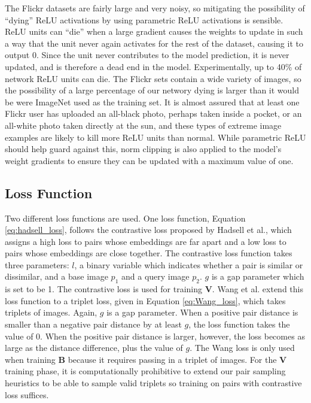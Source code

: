 The Flickr datasets are fairly large and very noisy, so mitigating the possibility of ``dying'' ReLU activations by using parametric ReLU activations is sensible. ReLU units can ``die'' when a large gradient causes the weights to update in such a way that the unit never again activates for the rest of the dataset, causing it to output 0. Since the unit never contributes to the model prediction, it is never updated, and is therefore a dead end in the model. Experimentally, up to 40\% of network ReLU units can die. The Flickr sets contain a wide variety of images, so the possibility of a large percentage of our networy dying is larger than it would be were ImageNet used as the training set. It is almost assured that at least one Flickr user has uploaded an all-black photo, perhaps taken inside a pocket, or an all-white photo taken directly at the sun, and these types of extreme image examples are likely to kill more ReLU units than normal. While parametric ReLU should help guard against this, norm clipping is also applied to the model's weight gradients to ensure they can be updated with a maximum value of one.

\subsection{Loss Function}
Two different loss functions are used. One loss function, Equation \ref{eq:hadsell_loss}, follows the contrastive loss proposed by Hadsell et al.\cite{hadsell2006dimensionality}, which assigns a high loss to pairs whose embeddings are far apart and a low loss to pairs whose embeddings are close together. The contrastive loss function takes three parameters: $l$, a binary variable which indicates whether a pair is similar or dissimilar, and a base image $p_1$ and a query image $p_2$. $g$ is a gap parameter which is set to be 1. The contrastive loss is used for training $\mathbf{V}$. Wang et al.\cite{wang2014learning} extend this loss function to a triplet loss, given in Equation \ref{eq:Wang_loss}, which takes triplets of images. Again, $g$ is a gap parameter. When a positive pair distance is smaller than a negative pair distance by at least $g$, the loss function takes the value of 0. When the positive pair distance is larger, however, the loss becomes as large as the distance difference, plus the value of $g$. The Wang loss is only used when training $\mathbf{B}$ because it requires passing in a triplet of images. For the $\mathbf{V}$ training phase, it is computationally prohibitive to extend our pair sampling heuristics to be able to sample valid triplets so training on pairs with contrastive loss suffices.

